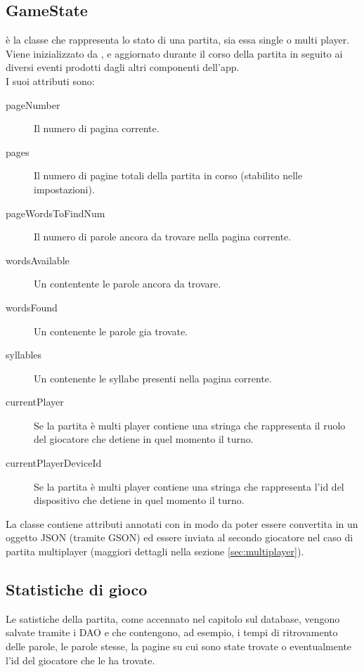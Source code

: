 \subsection{GameState}
\label{sec:game_state}
 è la classe che rappresenta lo stato di una partita, sia essa single o multi player. Viene inizializzato da , e aggiornato durante il corso della partita in seguito ai diversi eventi prodotti dagli altri componenti dell'app.\\
I suoi attributi sono:
\begin{description}
    \item[pageNumber] Il numero di pagina corrente.
    \item[pages] Il numero di pagine totali della partita in corso (stabilito nelle impostazioni).
    \item[pageWordsToFindNum] Il numero di parole ancora da trovare nella pagina corrente.
    \item[wordsAvailable] Un  contentente le parole ancora da trovare.
    \item[wordsFound] Un  contenente le parole gia trovate.
    \item[syllables] Un  contenente le syllabe presenti nella pagina corrente.
    \item[currentPlayer] Se la partita è multi player contiene una stringa che rappresenta il ruolo del giocatore che detiene in quel momento il turno.
    \item[currentPlayerDeviceId] Se la partita è multi player contiene una stringa che rappresenta l'id del dispositivo che detiene in quel momento il turno.
\end{description}

La classe  contiene attributi annotati con  in modo da poter essere convertita in un oggetto JSON (tramite GSON) ed essere inviata al secondo giocatore nel caso di partita multiplayer (maggiori dettagli nella sezione \ref{sec:multiplayer}).

\subsection{Statistiche di gioco}
\label{sec:stats}
Le satistiche della partita, come accennato nel capitolo sul database, vengono salvate tramite i DAO  e  che contengono, ad esempio, i tempi di ritrovamento delle parole, le parole stesse, la pagine su cui sono state trovate o eventualmente l'id del giocatore che le ha trovate.


